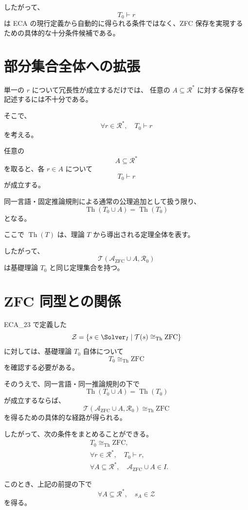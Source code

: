 \documentclass[a4paper,11pt]{article}
\begin{document}
したがって、
\[
T_0\vdash r
\]
は ECA の現行定義から自動的に得られる条件ではなく、ZFC 保存を実現するための具体的な十分条件候補である。

\section{部分集合全体への拡張}

単一の $r$ について冗長性が成立するだけでは、
任意の $A\subseteq\mathcal{R}^*$ に対する保存を記述するには不十分である。

そこで、
\[
\boxed{\forall r\in\mathcal{R}^*,\quad T_0\vdash r}
\]
を考える。

任意の
\[
A\subseteq\mathcal{R}^*
\]
を取ると、各 $r\in A$ について
\[
T_0\vdash r
\]
が成立する。

同一言語・固定推論規則による通常の公理追加として扱う限り、
\[
\operatorname{Th}(T_0\cup A)
=
\operatorname{Th}(T_0)
\]
となる。

ここで $\operatorname{Th}(T)$ は、理論 $T$ から導出される定理全体を表す。

したがって、
\[
\mathcal{T}(\mathcal{A}_{\mathrm{ZFC}}\cup A,\mathcal{R}_0)
\]
は基礎理論 $T_0$ と同じ定理集合を持つ。

\section{ZFC 同型との関係}
ECA_23 で定義した
\[
\mathcal{Z}=
\left\{
s\in\Solver_I
\mid
\mathcal{T}(s)\cong_{\mathrm{Th}}\mathrm{ZFC}
\right\}
\]
に対しては、基礎理論 $T_0$ 自体について
\[
T_0\cong_{\mathrm{Th}}\mathrm{ZFC}
\]
を確認する必要がある。

そのうえで、同一言語・同一推論規則の下で
\[
\operatorname{Th}(T_0\cup A)
=
\operatorname{Th}(T_0)
\]
が成立するならば、
\[
\mathcal{T}(\mathcal{A}_{\mathrm{ZFC}}\cup A,\mathcal{R}_0)
\cong_{\mathrm{Th}}
\mathrm{ZFC}
\]
を得るための具体的な経路が得られる。

したがって、次の条件をまとめることができる。
\[
\boxed{
\begin{aligned}
&T_0\cong_{\mathrm{Th}}\mathrm{ZFC},\\
&\forall r\in\mathcal{R}^*,\quad T_0\vdash r,\\
&\forall A\subseteq\mathcal{R}^*,\quad
\mathcal{A}_{\mathrm{ZFC}}\cup A\in I.
\end{aligned}}
\]

このとき、上記の前提の下で
\[
\forall A\subseteq\mathcal{R}^*,\quad s_A\in\mathcal{Z}
\]
を得る。
\end{document}
